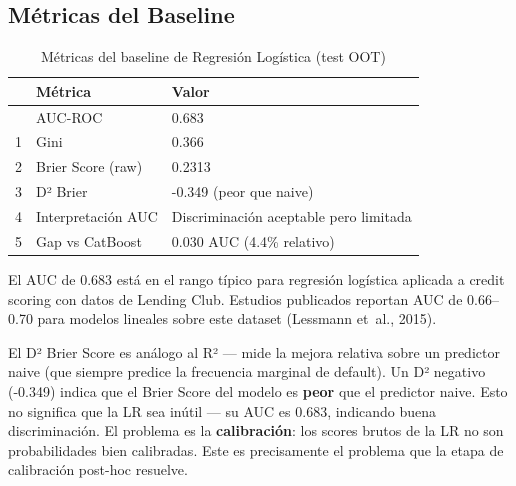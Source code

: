 \documentclass[
  spanish,
  11pt,
  letterpaper,
]{scrbook}
\theoremstyle{plain}
\theoremstyle{remark}
\begin{document}
\subsection{Métricas del Baseline}\label{muxe9tricas-del-baseline}

{

\begin{longtable}[]{@{}lll@{}}

\caption{\label{tbl-lr-metrics}Métricas del baseline de Regresión
Logística (test OOT)}

\tabularnewline

\toprule\noalign{}
& Métrica & Valor \\
\midrule\noalign{}
\endhead
\bottomrule\noalign{}
\endlastfoot
0 & AUC-ROC & 0.683 \\
1 & Gini & 0.366 \\
2 & Brier Score (raw) & 0.2313 \\
3 & D² Brier & -0.349 (peor que naive) \\
4 & Interpretación AUC & Discriminación aceptable pero limitada \\
5 & Gap vs CatBoost & 0.030 AUC (4.4\% relativo) \\

\end{longtable}

}

El AUC de 0.683 está en el rango típico para regresión logística
aplicada a credit scoring con datos de Lending Club. Estudios publicados
reportan AUC de 0.66--0.70 para modelos lineales sobre este dataset
({Lessmann et~al.}, 2015).

\begin{tcolorbox}[enhanced jigsaw, arc=.35mm, bottomrule=.15mm, bottomtitle=1mm, breakable, colback=white, colbacktitle=quarto-callout-note-color!10!white, colframe=quarto-callout-note-color-frame, coltitle=black, left=2mm, leftrule=.75mm, opacityback=0, opacitybacktitle=0.6, rightrule=.15mm, title=\textcolor{quarto-callout-note-color}{\faInfo}\hspace{0.5em}{D² Brier negativo: ¿qué significa?}, titlerule=0mm, toprule=.15mm, toptitle=1mm]

El D² Brier Score es análogo al R² --- mide la mejora relativa sobre un
predictor naive (que siempre predice la frecuencia marginal de default).
Un D² negativo (-0.349) indica que el Brier Score del modelo es
\textbf{peor} que el predictor naive. Esto no significa que la LR sea
inútil --- su AUC es 0.683, indicando buena discriminación. El problema
es la \textbf{calibración}: los scores brutos de la LR no son
probabilidades bien calibradas. Este es precisamente el problema que la
etapa de calibración post-hoc resuelve.

\end{tcolorbox}
\end{document}

